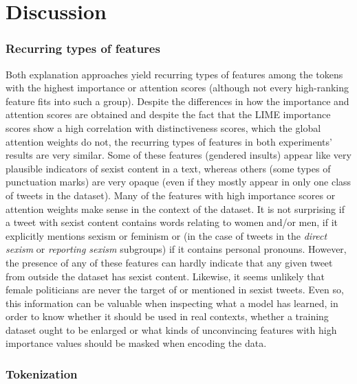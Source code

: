 \section{Discussion}
\label{sec:tweets-discussion}


\subsubsection{Recurring types of features}

Both explanation approaches yield recurring types of features among the tokens with the highest importance or attention scores (although not every high-ranking feature fits into such a group).
Despite the differences in how the importance and attention scores are obtained and despite the fact that the LIME importance scores show a high correlation with distinctiveness scores, which the global attention weights do not, the recurring types of features in both experiments' results are very similar.
Some of these features (gendered insults) appear like very plausible indicators of sexist content in a text, whereas others (some types of punctuation marks) are very opaque (even if they mostly appear in only one class of tweets in the dataset). 
Many of the features with high importance scores or attention weights make sense in the context of the dataset.
It is not surprising if a tweet with sexist content contains words relating to women and/or men, if it explicitly mentions sexism or feminism or (in the case of tweets in the \textit{direct sexism} or \textit{reporting sexism} subgroups) if it contains personal pronouns.
However, the presence of any of these features can hardly indicate that any given tweet from outside the dataset has sexist content.
Likewise, it seems unlikely that female politicians are never the target of or mentioned in sexist tweets.
Even so, this information can be valuable when inspecting what a model has learned, in order to know whether it should be used in real contexts, whether a training dataset ought to be enlarged or what kinds of unconvincing features with high importance values should be masked when encoding the data.

\subsubsection{Tokenization}

